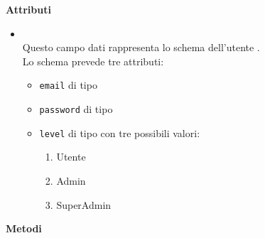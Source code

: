 \textbf{Attributi}
\begin{itemize}
\item[] \textbf{} \\ Questo campo dati rappresenta lo schema  dell'utente . \\
Lo schema prevede tre attributi:
\begin{itemize}
\item[]  \texttt{email} di tipo 
\item[]  \texttt{password} di tipo 
\item[]  \texttt{level} di tipo  con tre possibili valori: 
\begin{enumerate}
\item Utente
\item Admin
\item SuperAdmin
\end{enumerate}
\end{itemize}

\end{itemize}
\textbf{Metodi}
